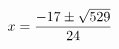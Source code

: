 \documentclass[preview]{standalone}
\begin{document}
\begin{align*}
\special{dvisvgm:raw <g id='unique000'>}x = \frac{-17 \pm \sqrt{529}}{24}\special{dvisvgm:raw </g>}
\end{align*}
\end{document}
